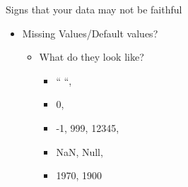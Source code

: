 \documentclass[aspectratio=169]{../latex_main/tntbeamer}  %
\begin{document}
	
	
	\begin{frame}{Signs that your data may not be faithful}
	    \begin{itemize}
	        \item Missing Values/Default values?
	        \begin{itemize}
	            \item What do they look like?
	            \begin{itemize}
	                \item “   “, 
	                \item 0, 
	                \item -1, 999, 12345, 
	                \item NaN, Null, 
	                \item 1970, 1900
	            \end{itemize}
	    \end{itemize}
	    \end{itemize}
	\end{frame}
	
	
	
\end{document}
